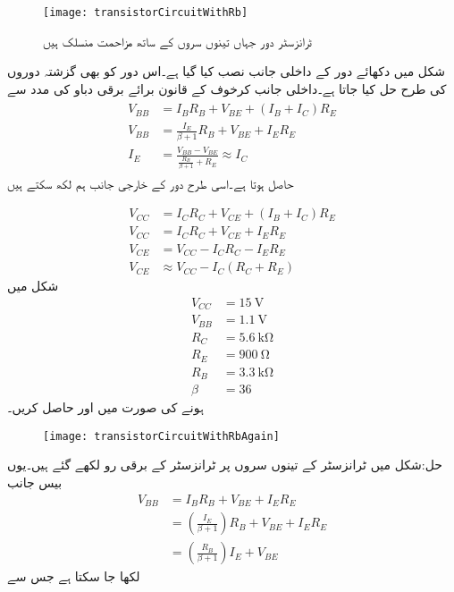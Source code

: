 \begin{figure}
\centering
\texttt{[image: transistorCircuitWithRb]}
\caption{ٹرانزسٹر دور جہاں تینوں سروں کے ساتھ مزاحمت منسلک ہیں}
\label{شکل_تینوں_سروں_پر_مزاحمت}
\end{figure}

شکل  میں دکھائے دور کے داخلی جانب  نصب کیا گیا ہے۔اس دور کو بھی گزشتہ دوروں کی طرح حل کیا جاتا ہے۔داخلی جانب کرخوف کے قانون برائے برقی دباو کی مدد سے 
\begin{gather} \label{مساوات_ٹرانزسٹر_دور_بمع_تینوں_مزاحمت_کی_داخلی_جانب}
\begin{aligned}
V_{BB}&=I_B R_B+V_{BE}+( I_B+I_C )R_E \\
V_{BB}& =\frac{I_E}{\beta+1} R_B +V_{BE}+I_E R_E\\
I_E&=\frac{V_{BB}-V_{BE}}{\frac{R_B}{\beta+1}+R_E} \approx I_C
\end{aligned}
\end{gather}
حاصل ہوتا ہے۔اسی طرح دور کے خارجی جانب ہم لکھ سکتے ہیں

\begin{align} \label{مساوات_ٹرانزسٹر_دور_بمع_تینوں_مزاحمت_کی_خارجی_جانب}
V_{CC}&=I_C R_C +V_{CE}+(I_B+I_C)R_E\\
V_{CC}&=I_C R_C + V_{CE}+I_E R_E\\
V_{CE}&=V_{CC}-I_C R_C-I_E R_E\\
V_{CE} & \approx V_{CC} -I_C(R_C+R_E)
\end{align}
شکل   میں
\begin{align*}
V_{CC}&=\SI{15}{\volt}\\
V_{BB}&=\SI{1.1}{\volt} \\
R_C&=\SI{5.6}{\kilo \ohm} \\
R_E&=\SI{900}{\ohm}\\
R_B &=\SI{3.3}{\kilo \ohm}\\
\beta &=36
\end{align*}
ہونے کی صورت میں  اور  حاصل کریں۔
\begin{figure}
\centering
\texttt{[image: transistorCircuitWithRbAgain]}
\caption{}
\label{شکل_تینوں_سروں_پر_مزاحمت_الف}
\end{figure}

حل:شکل میں ٹرانزسٹر کے تینوں سروں پر ٹرانزسٹر کے برقی رو لکھے گئے ہیں۔یوں بیس جانب 
\begin{align*}
V_{BB}&=I_B R_B +V_{BE}+I_E R_E\\
&=\left(\frac{I_E}{\beta+1}\right) R_B +V_{BE}+I_E R_E\\
&=\left(\frac{R_B}{\beta+1} \right) I_E +V_{BE}
\end{align*}
لکھا جا سکتا ہے جس سے

